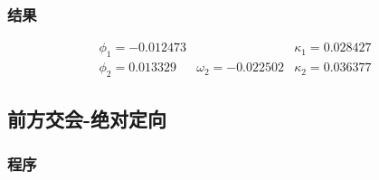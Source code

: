 \subsubsection{结果}
\begin{equation}
\begin{array}{lll}
\phi_1=-0.012473 & & \kappa_1=0.028427 \\
\phi_2=0.013329 & \omega_2=-0.022502 & \kappa_2=0.036377
\end{array}
\end{equation}

\subsection{前方交会-绝对定向}

\subsubsection{程序}

